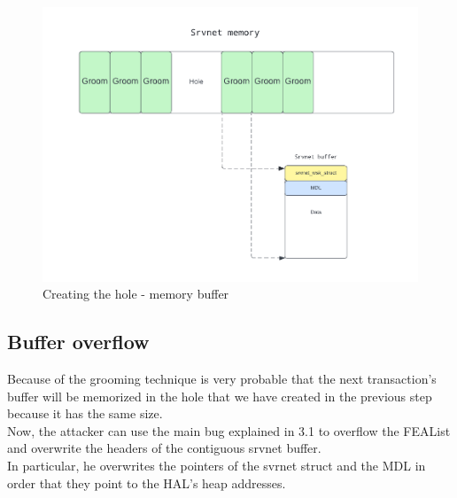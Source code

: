 \begin{figure}[ht!]
    \centering
      \includegraphics[scale=0.5]{images/exploit_4_buff.png}
      \caption{Creating the hole - memory buffer}
\end{figure}

\clearpage
\subsection{Buffer overflow}
Because of the grooming technique is very probable that the next transaction's buffer will be memorized in 
the hole that we have created in the previous step because it has the same size.\\
Now, the attacker can use the main bug explained in 3.1 to overflow the FEAList and overwrite the headers of the contiguous srvnet buffer\cite{eternalblue-checkpoint}.\\
In particular, he overwrites the pointers of the svrnet struct and the MDL in order that they point to the HAL's heap addresses.


